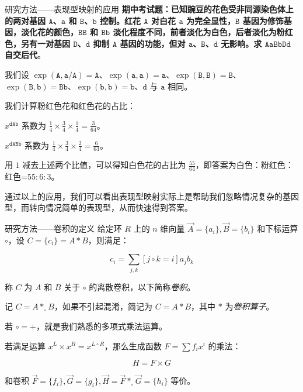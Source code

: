 \documentclass{beamer}
\begin{document}
	\begin{frame}{研究方法——表现型映射的应用}
		\textbf{期中考试题：已知豌豆的花色受非同源染色体上的两对基因 $\texttt{A}$、$\texttt{a}$ 和 $\texttt{B}$、$\texttt{b}$ 控制。红花 $\texttt{A}$ 对白花 $\texttt{a}$ 为完全显性，$\texttt{B}$ 基因为修饰基因，淡化花的颜色，$\texttt{BB}$ 和 $\texttt{Bb}$ 淡化程度不同，前者淡化为白色，后者淡化为粉红色，另有一对基因 $\texttt{D}$、$\texttt{d}$ 抑制 $\texttt{A}$ 基因的功能，但对 $\texttt{a}$、$\texttt{B}$、$\texttt{d}$ 无影响。求 $\texttt{AaBbDd}$ 自交后代}。
		
		我们设 $\operatorname{exp}(\texttt{A},\texttt{a}/\texttt{A})=\texttt{A}$、$\operatorname{exp}(\texttt{a},\texttt{a})=\texttt{a}$、$\operatorname{exp}(\texttt{B},\texttt{B})=\texttt{B}$、$\operatorname{exp}(\texttt{B},\texttt{b})=\texttt{Bb}$、$\operatorname{exp}(\texttt{b},\texttt{b})=\texttt{b}$、$\texttt{d}$ 与 $\texttt{a}$ 相同。
		
		我们计算粉红色花和红色花的占比：
		
		$x^{\texttt{dAb}}$ 系数为 $\frac{1}{4} \times \frac{3}{4} \times \frac{1}{4}=\frac{3}{64}$。
		
		$x^{\texttt{dABb}}$ 系数为 $\frac{1}{4} \times \frac{3}{4} \times \frac{2}{4}=\frac{6}{64}$。
		
		用 $1$ 减去上述两个比值，可以得知白色花的占比为 $\frac{55}{64}$，即答案为白色：粉红色：红色=$55:6:3$。
		
		通过以上的应用，我们可以看出表现型映射实际上是帮助我们忽略情况复杂的基因型，而转向情况简单的表现型，从而快速得到答案。
	\end{frame}

	\begin{frame}{研究方法——卷积的定义}
		给定环 $R$ 上的 $n$ 维向量 $\vec A=\{a_i\},\vec B=\{b_i\}$ 和下标运算 $\circ$，设 $C=\{c_i\}=A*B$，则满足：
		
		\begin{equation*}
			c_i=\sum_{j,k} [j \circ k=i] a_jb_k
		\end{equation*}
		
		称 $C$ 为 $A$ 和 $B$ 关于 $\circ$ 的离散卷积，以下简称\textsl{卷积}。
		
		记 $C=A*_{\circ}B$，如果不引起混淆，简记为 $C=A*B$，其中 $*$ 为\textsl{卷积算子}。
		
		若 $\circ = +$，就是我们熟悉的多项式乘法运算。
		
		若满足运算 $x^L \times x^R = x^{L \circ R}$，那么生成函数 $F=\sum f_i x^i$ 的乘法：
		
		$$H=F \times G$$
		
		和卷积 $\vec F=\{f_i\},\vec G=\{g_i\},\vec H=\vec F *_{\circ} \vec G=\{h_i\}$ 等价。
	\end{frame}
\end{document}
